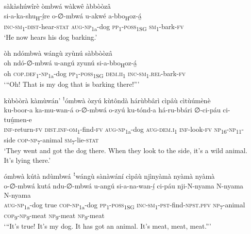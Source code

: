 sàkàshúwîrè òmbwá wàkwê àbbòòzâ\\
\gll si-a-ka-shu\textsubscript{H}{}-í̲re    o-∅-mbwá    u-akwé  a-bbo\textsubscript{H}oz-á̲\\
\textsc{inc}{}-\textsc{sm}\textsubscript{1}{}-\textsc{dist}{}-hear-\textsc{stat}  \textsc{aug}{}-\textsc{np}\textsubscript{1a}{}-dog  \textsc{pp}\textsubscript{1}{}-\textsc{poss}\textsubscript{1SG}  \textsc{sm}\textsubscript{1}{}-bark-\textsc{fv}\\
\glt ‘He now hears his dog barking.’\bigskip

òh ndómbwà wángù zyùnú sàbbòòzâ\\
\gll oh  ndó-∅-mbwá  u-angú  zyunú    si-a-bbo\textsubscript{H}oz-á̲\\
oh  \textsc{cop}.\textsc{def}\textsubscript{1}{}-\textsc{np}\textsubscript{1a}{}-dog  \textsc{pp}\textsubscript{1}{}-\textsc{poss}\textsubscript{1SG}  \textsc{dem}.\textsc{ii}\textsubscript{1} \textsc{inc}{}-\textsc{sm}\textsubscript{1}.\textsc{rel}{}-bark-\textsc{fv}\\
\glt ‘“Oh! That is my dog that is barking there!”’\bigskip

kùbòòrà kàmùwán’ ꜝómbwà òzyú kùtôndà hárùbbârì cìpâù cìtùúmènè\\
\gll ku-boor-a    ka-mu-wan-á    o-∅-mbwá o-zyú    ku-tónd-a  há-ru-bbári     ∅-ci-páu    ci-tuú̲men-e\\
\textsc{inf}{}-return-\textsc{fv}  \textsc{dist}.\textsc{inf}{}-\textsc{om}\textsubscript{1}{}-find-\textsc{fv}  \textsc{aug}{}-\textsc{np}\textsubscript{1a}{}-dog
\textsc{aug}{}-\textsc{dem}.\textsc{i}\textsubscript{1}  \textsc{inf}{}-look-\textsc{fv}  \textsc{np}\textsubscript{16}{}-\textsc{np}\textsubscript{11}{}-side   \textsc{cop}{}-\textsc{np}\textsubscript{7}{}-animal  \textsc{sm}\textsubscript{7}{}-lie-\textsc{stat}\\
\glt ‘They went and got the dog there. When they look to the side, it’s a wild animal. It’s lying there.’\bigskip

ómbwà kútà ndùmbwá ꜝwángù sànàwání cìpâù njìnyàmà nyàmà nyàmà\\
\gll o-∅-mbwá    kutá  ndu-∅-mbwá  u-angú  si-a-na-wan-í̲       ci-páu   nji-N-nyama  N-nyama   N-nyama\\
\textsc{aug}{}-\textsc{np}\textsubscript{1a}{}-dog  true  \textsc{cop}{}-\textsc{np}\textsubscript{1a}{}-dog  \textsc{pp}\textsubscript{1}{}-\textsc{poss}\textsubscript{1SG}
\textsc{inc}{}-\textsc{sm}\textsubscript{1}{}-\textsc{pst}{}-find-\textsc{npst}.\textsc{pfv}  \textsc{np}\textsubscript{7}{}-animal
\textsc{cop}\textsubscript{9}{}-\textsc{np}\textsubscript{9}{}-meat  \textsc{np}\textsubscript{9}{}-meat  \textsc{np}\textsubscript{9}{}-meat\\
\glt ‘“It’s true! It’s my dog. It has got an animal. It’s meat, meat, meat.”’\bigskip

